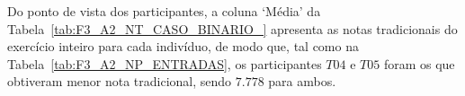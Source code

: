 Do ponto de vista dos participantes, a coluna `Média' da Tabela~\ref{tab:F3_A2_NT_CASO_BINARIO_} apresenta as notas tradicionais do exercício inteiro para cada indivíduo, de modo que, tal como na Tabela~\ref{tab:F3_A2_NP_ENTRADAS}, os participantes $T04$ e $T05$ foram os que obtiveram menor nota tradicional, sendo $7.778$ para ambos.

